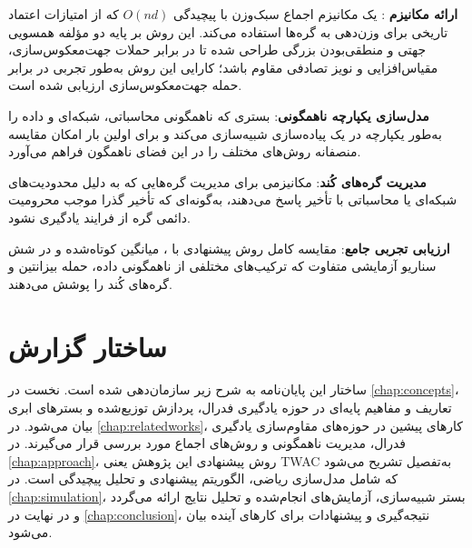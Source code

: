 \begin{itemize}
    \tick 
    \textbf{ارائه مکانیزم }: یک مکانیزم اجماع سبک‌وزن با پیچیدگی $O(nd)$ که از امتیازات اعتماد تاریخی برای وزن‌دهی به گره‌ها استفاده می‌کند. این روش بر پایه دو مؤلفه همسویی جهتی و منطقی‌بودن بزرگی طراحی شده تا در برابر حملات جهت‌معکوس‌سازی، مقیاس‌افزایی و نویز تصادفی مقاوم باشد؛ کارایی این روش به‌طور تجربی در برابر حمله جهت‌معکوس‌سازی ارزیابی شده است.

    \tick 
    \textbf{مدل‌سازی یکپارچه ناهمگونی}: بستری که ناهمگونی محاسباتی، شبکه‌ای و داده را به‌طور یکپارچه در یک پیاده‌سازی شبیه‌سازی می‌کند و برای اولین بار امکان مقایسه منصفانه روش‌های مختلف را در این فضای ناهمگون فراهم می‌آورد.

    \tick 
    \textbf{مدیریت گره‌های کُند}: مکانیزمی برای مدیریت گره‌هایی که به دلیل محدودیت‌های شبکه‌ای یا محاسباتی با تأخیر پاسخ می‌دهند، به‌گونه‌ای که تأخیر گذرا موجب محرومیت دائمی گره از فرایند یادگیری نشود.

    \tick 
    \textbf{ارزیابی تجربی جامع}: مقایسه کامل روش پیشنهادی با ، میانگین کوتاه‌شده و  در شش سناریو آزمایشی متفاوت که ترکیب‌های مختلفی از ناهمگونی داده، حمله بیزانتین و گره‌های کُند را پوشش می‌دهند.
\end{itemize}

\section{ساختار گزارش}
\label{sec:structure}

ساختار این پایان‌نامه به شرح زیر سازمان‌دهی شده است. نخست در 
\autoref{chap:concepts}،
تعاریف و مفاهیم پایه‌ای در حوزه یادگیری فدرال، پردازش توزیع‌شده و بسترهای ابری بیان می‌شود. در
\autoref{chap:relatedworks}،
کارهای پیشین در حوزه‌های مقاوم‌سازی یادگیری فدرال، مدیریت ناهمگونی و روش‌های اجماع مورد بررسی قرار می‌گیرند. در
\autoref{chap:approach}،
روش پیشنهادی این پژوهش یعنی \gls{TWAC} به‌تفصیل تشریح می‌شود که شامل مدل‌سازی ریاضی، الگوریتم پیشنهادی و تحلیل پیچیدگی است. در
\autoref{chap:simulation}،
بستر شبیه‌سازی، آزمایش‌های انجام‌شده و تحلیل نتایج ارائه می‌گردد و در نهایت در
\autoref{chap:conclusion}،
نتیجه‌گیری و پیشنهادات برای کارهای آینده بیان می‌شود.
